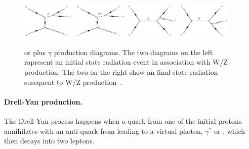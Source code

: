\begin{figure}[h!]
\centering
  \includegraphics[width=0.23\textwidth]{Figures/c4/dia/40000101.pdf}
  \includegraphics[width=0.23\textwidth]{Figures/c4/dia/40000111.pdf}
  \includegraphics[width=0.23\textwidth]{Figures/c4/dia/40000104.pdf}
  \includegraphics[width=0.23\textwidth]{Figures/c4/dia/40000114.pdf}
  \caption{\PW or \PZ plus $\gamma$ production diagrams. The two
    diagrams on the left rapresent an initial state
radiation event in association with W/Z production. The two on the
right show an final state
radiation susequent to W/Z production~\cite{diagram}.}
  \label{fig:c43}
\end{figure}

\paragraph{Drell-Yan production.}\label{sec:c4dy}
The Drell-Yan process happens when a quark from one of the initial
protons annihilates with an anti-quark from leading to a virtual
photon, $\gamma^{*}$ or
\PZ, which then decays into two leptons.

